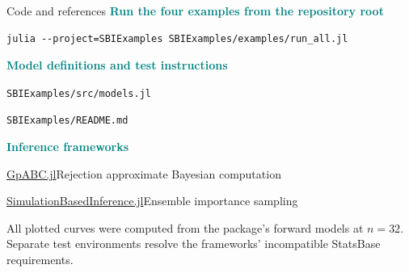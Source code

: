 \documentclass[aspectratio=169,11pt]{beamer}
\newcommand{\sbiaccent}[1]{\textcolor{Teal}{\textbf{#1}}}
\newcommand{\captiontext}[1]{{\scriptsize\color{Muted}#1\par}}
\begin{document}
\begin{frame}[fragile]{Code and references}
\sbiaccent{Run the four examples from the repository root}
\begin{verbatim}
julia --project=SBIExamples SBIExamples/examples/run_all.jl
\end{verbatim}
\vspace{3mm}
\sbiaccent{Model definitions and test instructions}\par
\texttt{SBIExamples/src/models.jl}\par
\texttt{SBIExamples/README.md}\par
\vspace{3mm}
\sbiaccent{Inference frameworks}\par
\href{https://github.com/tanhevg/GpABC.jl}{GpABC.jl}\quad\textcolor{Muted}{Rejection approximate Bayesian computation}\par
\href{https://github.com/bgroenks96/SimulationBasedInference.jl}{SimulationBasedInference.jl}\quad\textcolor{Muted}{Ensemble importance sampling}\par
\vspace{3mm}
\captiontext{All plotted curves were computed from the package's forward models at $n=32$. Separate test environments resolve the frameworks' incompatible StatsBase requirements.}
\end{frame}
\end{document}
